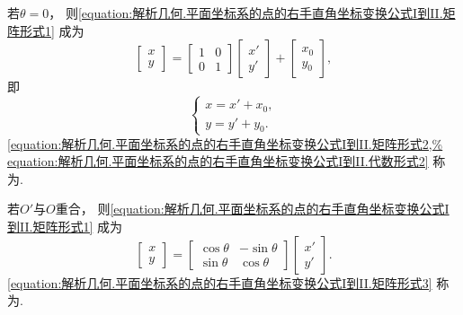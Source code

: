 若\(\theta=0\)，
则\cref{equation:解析几何.平面坐标系的点的右手直角坐标变换公式I到II.矩阵形式1} 成为
\begin{equation}\label{equation:解析几何.平面坐标系的点的右手直角坐标变换公式I到II.矩阵形式2}
	\begin{bmatrix}
		x \\ y
	\end{bmatrix} = \begin{bmatrix}
		1 & 0 \\
		0 & 1
	\end{bmatrix}
	\begin{bmatrix}
		x' \\ y'
	\end{bmatrix} + \begin{bmatrix}
		x_0 \\ y_0
	\end{bmatrix},
\end{equation}
即\begin{equation}\label{equation:解析几何.平面坐标系的点的右手直角坐标变换公式I到II.代数形式2}
	\left\{ \begin{array}{l}
		x = x' + x_0, \\
		y = y' + y_0.
	\end{array} \right.
\end{equation}
\cref{equation:解析几何.平面坐标系的点的右手直角坐标变换公式I到II.矩阵形式2,%
equation:解析几何.平面坐标系的点的右手直角坐标变换公式I到II.代数形式2}
称为.

若\(O'\)与\(O\)重合，
则\cref{equation:解析几何.平面坐标系的点的右手直角坐标变换公式I到II.矩阵形式1} 成为
\begin{equation}\label{equation:解析几何.平面坐标系的点的右手直角坐标变换公式I到II.矩阵形式3}
	\begin{bmatrix}
		x \\ y
	\end{bmatrix}
	= \begin{bmatrix}
		\cos\theta & -\sin\theta \\
		\sin\theta & \cos\theta
	\end{bmatrix}
	\begin{bmatrix}
		x' \\ y'
	\end{bmatrix}.
\end{equation}
\cref{equation:解析几何.平面坐标系的点的右手直角坐标变换公式I到II.矩阵形式3}
称为.

